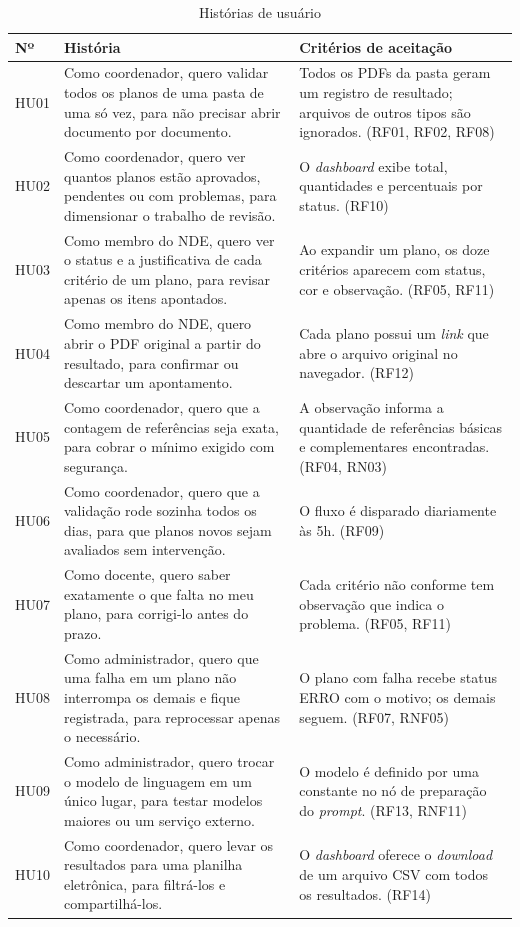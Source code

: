 \begin{table}[H]
\centering
\caption{Histórias de usuário}
\label{tab:historias}
\footnotesize
\begin{tabular}{@{}L{1.1cm}L{7.0cm}L{6.3cm}@{}}
\toprule
{}
\textbf{Nº} & \textbf{História} & \textbf{Critérios de aceitação} \\ \midrule
HU01 & Como coordenador, quero validar todos os planos de uma pasta de uma só vez, para não precisar abrir documento por documento. & Todos os PDFs da pasta geram um registro de resultado; arquivos de outros tipos são ignorados. (RF01, RF02, RF08) \\
HU02 & Como coordenador, quero ver quantos planos estão aprovados, pendentes ou com problemas, para dimensionar o trabalho de revisão. & O \textit{dashboard} exibe total, quantidades e percentuais por status. (RF10) \\
HU03 & Como membro do NDE, quero ver o status e a justificativa de cada critério de um plano, para revisar apenas os itens apontados. & Ao expandir um plano, os doze critérios aparecem com status, cor e observação. (RF05, RF11) \\
HU04 & Como membro do NDE, quero abrir o PDF original a partir do resultado, para confirmar ou descartar um apontamento. & Cada plano possui um \textit{link} que abre o arquivo original no navegador. (RF12) \\
HU05 & Como coordenador, quero que a contagem de referências seja exata, para cobrar o mínimo exigido com segurança. & A observação informa a quantidade de referências básicas e complementares encontradas. (RF04, RN03) \\
HU06 & Como coordenador, quero que a validação rode sozinha todos os dias, para que planos novos sejam avaliados sem intervenção. & O fluxo é disparado diariamente às 5h. (RF09) \\
HU07 & Como docente, quero saber exatamente o que falta no meu plano, para corrigi-lo antes do prazo. & Cada critério não conforme tem observação que indica o problema. (RF05, RF11) \\
HU08 & Como administrador, quero que uma falha em um plano não interrompa os demais e fique registrada, para reprocessar apenas o necessário. & O plano com falha recebe status ERRO com o motivo; os demais seguem. (RF07, RNF05) \\
HU09 & Como administrador, quero trocar o modelo de linguagem em um único lugar, para testar modelos maiores ou um serviço externo. & O modelo é definido por uma constante no nó de preparação do \textit{prompt}. (RF13, RNF11) \\
HU10 & Como coordenador, quero levar os resultados para uma planilha eletrônica, para filtrá-los e compartilhá-los. & O \textit{dashboard} oferece o \textit{download} de um arquivo CSV com todos os resultados. (RF14) \\ \bottomrule
\end{tabular}
\end{table}

